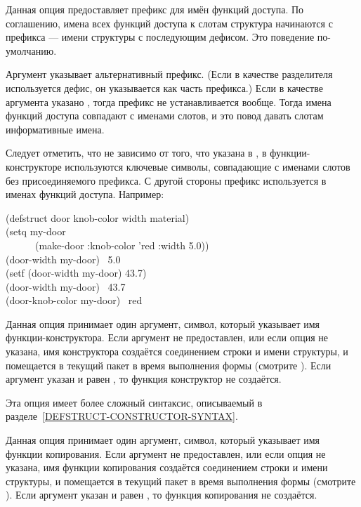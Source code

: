 \begin{flushdesc}

\item[\cd{:conc-name}]
Данная опция предоставляет префикс для имён функций доступа.
По соглашению, имена всех функций доступа к слотам структура начинаются с
префикса --- имени структуры с последующим дефисом. Это поведение
по-умолчанию.

Аргумент  указывает альтернативный префикс. (Если в качестве
разделителя используется дефис, он указывается как часть префикса.)
Если в качестве аргумента указано {\false}, тогда префикс не устанавливается
вообще.
Тогда имена функций доступа совпадают с именами слотов, и это повод давать
слотам информативные имена. 

Следует отметить, что не зависимо от того, что указана в , в
функции-конструкторе используются ключевые символы, совпадающие с именами
слотов без присоединяемого префикса.
С другой стороны префикс используется в именах функций доступа. Например:
\begin{lisp}
(defstruct door knob-color width material) \\
(setq my-door \\
~~~~~~(make-door :knob-color 'red :width 5.0)) \\
(door-width my-door) \EV\ 5.0 \\
(setf (door-width my-door) 43.7) \\
(door-width my-door) \EV\ 43.7 \\
(door-knob-color my-door) \EV\ red
\end{lisp}

\item[\cd{:constructor}]
Данная опция принимает один аргумент, символ, который указывает имя функции-конструктора. Если аргумент не предоставлен, или если опция не указана, имя
конструктора создаётся соединением строки  и имени структуры, и
помещается в текущий пакет в время выполнения формы  (смотрите
).
Если аргумент указан и равен {\fase}, то функция конструктор не создаётся.

Эта опция имеет более сложный синтаксис, описываемый в
разделе~\ref{DEFSTRUCT-CONSTRUCTOR-SYNTAX}.

\item[\cd{:copier}]
Данная опция принимает один аргумент, символ, который указывает имя функции
копирования. Если аргумент не предоставлен, или если опция не указана, имя
функции копирования создаётся соединением строки  и имени структуры, и
помещается в текущий пакет в время выполнения формы  (смотрите
).
Если аргумент указан и равен {\fase}, то функция копирования не создаётся.


\end{flushdesc}
